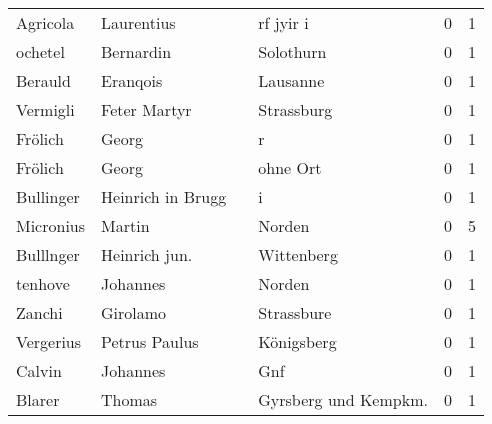 \begin{center}
\begin{tiny}
\begin{longtabu}{llllrr}
                 Agricola &                         Laurentius &             &                                   rf jyir i &          0 &         1 \\
                  ochetel &                          Bernardin &             &                                   Solothurn &          0 &         1 \\
                  Berauld &                           Eranqois &             &                                    Lausanne &          0 &         1 \\
                 Vermigli &                       Feter Martyr &             &                                  Strassburg &          0 &         1 \\
                  Frölich &                              Georg &             &                                           r &          0 &         1 \\
                  Frölich &                              Georg &             &                                    ohne Ort &          0 &         1 \\
                Bullinger &                  Heinrich in Brugg &             &                                           i &          0 &         1 \\
                Micronius &                             Martin &             &                                      Norden &          0 &         5 \\
                Bulllnger &                      Heinrich jun. &             &                                  Wittenberg &          0 &         1 \\
                  tenhove &                           Johannes &             &                                      Norden &          0 &         1 \\
                   Zanchi &                           Girolamo &             &                                  Strassbure &          0 &         1 \\
                Vergerius &                      Petrus Paulus &             &                                  Königsberg &          0 &         1 \\
                   Calvin &                           Johannes &             &                                         Gnf &          0 &         1 \\
                   Blarer &                             Thomas &             &                       Gyrsberg und Kempkm.  &          0 &         1 \\

\end{longtabu}
\end{tiny}
\end{center}
